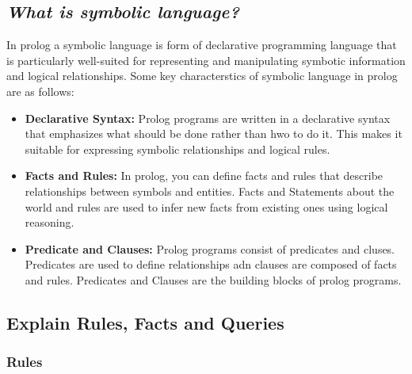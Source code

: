 \documentclass{article}
\begin{document}
\subsection{\textit{What is symbolic language?}}
In prolog a symbolic language is form of declarative programming language that is particularly well-suited for representing and manipulating symbotic information and logical relationships. Some key characterstics of symbolic language in prolog are as follows:
\begin{itemize}
    \item \textbf{Declarative Syntax:} Prolog programs are written in a declarative syntax that emphasizes what should be done rather than hwo to do it. This makes it suitable for expressing symbolic relationships and logical rules.
    \item \textbf{Facts and Rules:} In prolog, you can define facts and rules that describe relationships between symbols and entities. Facts and Statements about the world and rules are used to infer new facts from existing ones using logical reasoning.
    \item \textbf{Predicate and Clauses:} Prolog programs consist of predicates and cluses. Predicates are used to define relationships adn clauses are composed of facts and rules. Predicates and Clauses are the building blocks of prolog programs.
\end{itemize}
\subsection{\textbf{Explain Rules, Facts and Queries}}
\subsubsection*{\textbf{Rules}}
\end{document}
